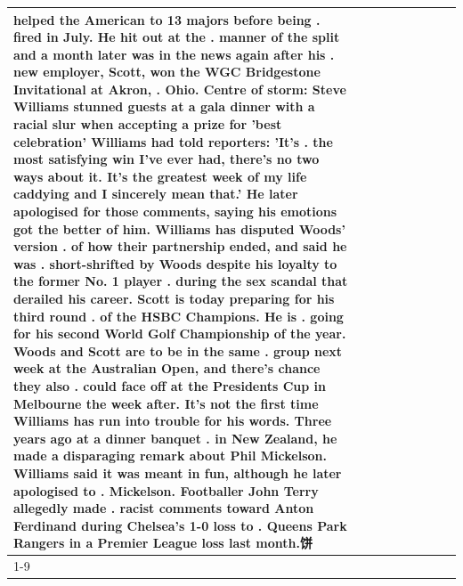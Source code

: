 \begin{table}[H]
\begin{tabular}{lllrlllll}
helped the American to 13 majors before being . fired in July. He hit out at the . manner of the split and a month later was in the news again after his . new employer, Scott, won the WGC Bridgestone Invitational at Akron, . Ohio. Centre of storm: Steve Williams stunned guests at a gala dinner with a racial slur when accepting a prize for 'best celebration' Williams had told reporters: 'It's . the most satisfying win I've ever had, there's no two ways about it. It's the greatest week of my life caddying and I sincerely mean that.' He later apologised for those comments, saying his emotions got the better of him. Williams has disputed Woods' version . of how their partnership ended, and said he was . short-shrifted by Woods despite his loyalty to the former No. 1 player . during the sex scandal that derailed his career. Scott is today preparing for his third round . of the HSBC Champions. He is . going for his second World Golf Championship of the year. Woods and Scott are to be in the same . group next week at the Australian Open, and there's chance they also . could face off at the Presidents Cup in Melbourne the week after. It's not the first time Williams has run into trouble for his words. Three years ago at a dinner banquet . in New Zealand, he made a disparaging remark about Phil Mickelson. Williams said it was meant in fun, although he later apologised to . Mickelson. Footballer John Terry allegedly made . racist comments toward Anton Ferdinand during Chelsea's 1-0 loss to . Queens Park Rangers in a Premier League loss last month.饼 \\
\cline{1-9}

\end{tabular}
\end{table}
